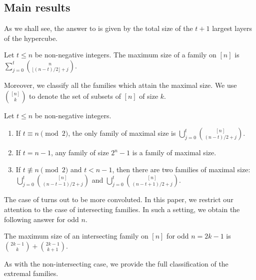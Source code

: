 \subsection{Main results}

As we shall see, the answer to  is given by the total size of the $t+1$ largest layers of the hypercube.

\begin{theorem}\label{th:nintersecting}
Let $t\leq n$ be non-negative integers. The maximum size of a  family on $[n]$ is $\sum_{j=0}^{t} \binom{n}{\lfloor(n-t)/2\rfloor + j}$. 
\end{theorem}

Moreover, we classify all the  families which attain the maximal size. We use $\binom{[n]}{k}$ to denote the set of subsets of $[n]$ of size $k$.

\begin{theorem}\label{th:nintersecting-class}
Let $t \leq n$ be non-negative integers.

\begin{enumerate}[\normalfont(a)]
\item\label{item:first}
If $t \equiv n \pmod{2}$, the only  family of maximal size is $\bigcup_{j=0}^{t} \binom{[n]}{(n-t)/2 + j}$.

\item\label{item:second}
If $t=n-1$, any family of size $2^n-1$ is a  family of maximal size.

\item\label{item:third}
If $t \not\equiv n \pmod 2$ and $t < n-1$, then there are two  families of maximal size: $\bigcup_{j=0}^{t} \binom{[n]}{(n-t-1)/2 + j}$ and $\bigcup_{j=0}^{t} \binom{[n]}{(n-t+1)/2 + j}$.
\end{enumerate}
\end{theorem}

The case of  turns out to be more convoluted. In this paper, we restrict our attention to the case of intersecting \saw families. In such a setting, we obtain the following answer for odd $n$.

\begin{theorem} \label{th:intersecting-odd}
The maximum size of an intersecting \saw family on $[n]$ for odd $n=2k-1$ is $\binom{2k-1}{k} + \binom{2k-1}{k+1}$.
\end{theorem}

As with the non-intersecting case, we provide the full classification of the extremal families.

